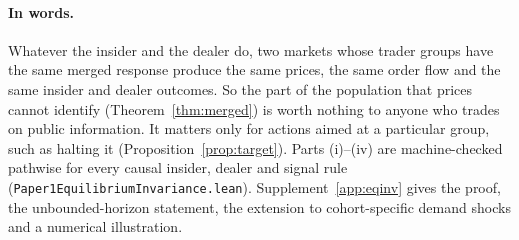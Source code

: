\documentclass[12pt]{article}
\theoremstyle{definition}
\theoremstyle{remark}
\begin{document}
\paragraph{In words.} Whatever the insider and the dealer do, two markets whose trader groups have the same merged response produce the same prices, the same order flow and the same insider and dealer outcomes. So the part of the population that prices cannot identify (Theorem~\ref{thm:merged}) is worth nothing to anyone who trades on public information. It matters only for actions aimed at a particular group, such as halting it (Proposition~\ref{prop:target}). Parts (i)--(iv) are machine-checked pathwise for every causal insider, dealer and signal rule (\nolinkurl{Paper1EquilibriumInvariance.lean}). Supplement~\ref{app:eqinv} gives the proof, the unbounded-horizon statement, the extension to cohort-specific demand shocks and a numerical illustration.
\end{document}
